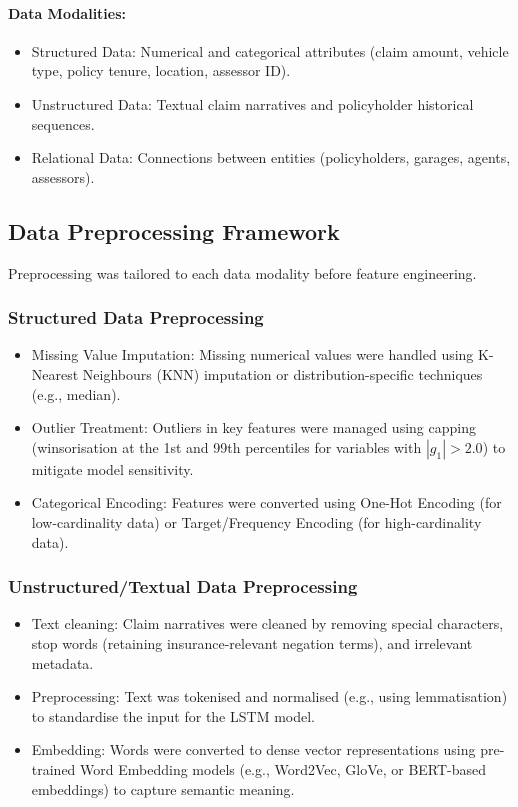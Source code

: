 \documentclass[12pt,a4paper,oneside]{report}
\numberwithin{equation}{chapter}
\begin{document}
\paragraph{Data Modalities:}
\begin{itemize}
    \item Structured Data: Numerical and categorical attributes (claim amount, vehicle type, policy tenure, location, assessor ID).
    \item Unstructured Data: Textual claim narratives and policyholder historical sequences.
    \item Relational Data: Connections between entities (policyholders, garages, agents, assessors).
\end{itemize}

\subsection{Data Preprocessing Framework}

Preprocessing was tailored to each data modality before feature engineering.

\subsubsection{Structured Data Preprocessing}
\label{sec:structured-preprocessing}

\begin{itemize}
    \item Missing Value Imputation: Missing numerical values were handled using K-Nearest Neighbours (KNN) imputation or distribution-specific techniques (e.g., median).
    \item Outlier Treatment: Outliers in key features were managed using capping (winsorisation at the 1st and 99th percentiles for variables with $|g_1| > 2.0$) to mitigate model sensitivity.
    \item Categorical Encoding: Features were converted using One-Hot Encoding (for low-cardinality data) or Target/Frequency Encoding (for high-cardinality data).
\end{itemize}

\subsubsection{Unstructured/Textual Data Preprocessing}
\label{sec:unstructured-preprocessing}

\begin{itemize}
    \item Text cleaning: Claim narratives were cleaned by removing special characters, stop words (retaining insurance-relevant negation terms), and irrelevant metadata.
    \item Preprocessing: Text was tokenised and normalised (e.g., using lemmatisation) to standardise the input for the LSTM model.
    \item Embedding: Words were converted to dense vector representations using pre-trained Word Embedding models (e.g., Word2Vec, GloVe, or BERT-based embeddings) to capture semantic meaning.
\end{itemize}
\end{document}
